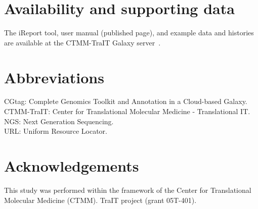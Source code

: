 \section*{Availability and supporting data}
The iReport tool, user manual (published page), and example data and histories are available at the CTMM-TraIT Galaxy server~\cite{url-traitgalaxy}.

\section*{Abbreviations}
CGtag: Complete Genomics Toolkit and Annotation in a Cloud-based Galaxy. \\
CTMM-TraIT: Center for Translational Molecular Medicine - Translational IT. \\
NGS: Next Generation Sequencing. \\
URL: Uniform Resource Locator. \\


\section*{Acknowledgements}
 This study was performed within the framework of the Center for Translational Molecular Medicine (CTMM). TraIT project (grant 05T-401).



\section*{}
